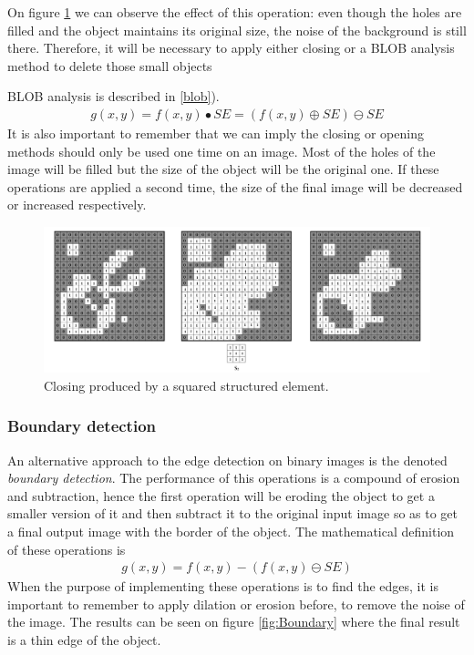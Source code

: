 On figure \ref{fig:Closing} we can observe the effect of this operation: even though the holes are filled and the object maintains its original size, the noise of the background is still there. Therefore, it will be necessary to apply either closing or a BLOB analysis method to delete those small objects {BLOB analysis is described in \ref{blob}).
\begin{equation}
\begin{aligned}
{g(x,y)}={f(x,y)}\bullet{SE}=({f(x,y)}\oplus{SE})\ominus{SE}
\label{Closing}
	\end{aligned}
\end{equation}
It is also important to remember that we can imply the closing or opening methods should only be used one time on an image. Most of the holes of the image will be filled but the size of the object will be the original one. If these operations are applied a second time, the size of the final image will be decreased or increased respectively.

\begin{figure}[htbp]
\centering
\includegraphics[width=1\textwidth]{Pictures/Theory/ClosingSq.png}
\caption{Closing produced by a squared structured element.}
\label{fig:Closing}
\end{figure}

\subsubsection{Boundary detection}
An alternative approach to the edge detection on binary images is the denoted \textit{boundary detection}. The performance of this operations is a compound of erosion and subtraction, hence the first operation will be eroding the object to get a smaller version of it and then subtract it to the original input image so as to get a final output image with the border of the object. The mathematical definition of these operations is
\begin{equation}
\begin{aligned}
{g(x,y)}={f(x,y)}-({f(x,y)}\ominus{SE})
\label{BoundDetec}
	\end{aligned}
\end{equation}
When the purpose of implementing these operations is to find the edges, it is important to remember to apply dilation or erosion before, to remove the noise of the image. The results can be seen on figure \ref{fig:Boundary} where the final result is a thin edge of the object.

}
